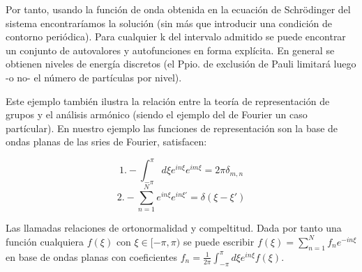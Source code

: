 Por tanto, usando la función de onda obtenida en la ecuación de Schrödinger del sistema encontraríamos la solución (sin más que introducir una condición de contorno periódica). Para cualquier k del intervalo admitido se puede encontrar un conjunto de autovalores y autofunciones en forma explícita. En general se obtienen niveles de energía discretos (el Ppio. de exclusión de Pauli limitará luego -o no- el número de partículas por nivel).

\smallskip
Este ejemplo también ilustra la relación entre la teoría de representación de grupos y el análisis armónico (siendo el ejemplo del de Fourier un caso partícular). En nuestro ejemplo las funciones de representación son la base de ondas planas de las sries de Fourier, satisfacen:

$$1.- \int ^\pi _{-\pi} d\xi e^{in\xi} e^{im\xi} =2\pi \delta _{m,n}$$
$$2.- \sum _{n=1}^N e^{in\xi}e^{in\xi '}=\delta (\xi-\xi ')$$

Las llamadas relaciones de ortonormalidad y compeltitud. Dada por tanto una función cualquiera $f(\xi)$ con $\xi \in [-\pi,\pi)$ se puede escribir $f(\xi)=\sum _{n=1}^N f_ne^{-in\xi}$ en base de ondas planas con coeficientes $f_n=\frac{1}{2\pi}\int^\pi _{-\pi}d\xi e^{in\xi}f(\xi)$.

\newpage
